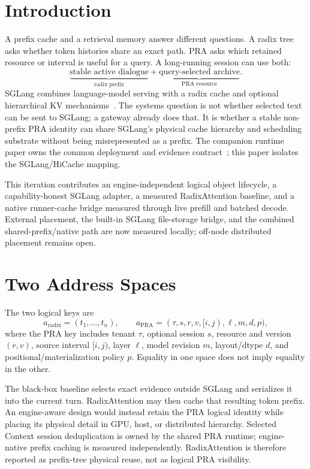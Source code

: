 \documentclass[10pt]{article}
\begin{document}
\section{Introduction}
A prefix cache and a retrieval memory answer different questions. A radix tree
asks whether token histories share an exact path. PRA asks which retained
resource or interval is useful for a query. A long-running session can use both:
\[
  \underbrace{\text{stable active dialogue}}_{\text{radix prefix}}
  +
  \underbrace{\text{query-selected archive}}_{\text{PRA resource}}.
\]
SGLang combines language-model serving with a radix cache and optional
hierarchical KV mechanisms~\cite{zheng2024sglang}. The systems question is not
whether selected text can be sent to SGLang; a gateway already does that. It is
whether a stable non-prefix PRA identity can share SGLang's physical cache
hierarchy and scheduling substrate without being misrepresented as a prefix.
The companion runtime paper owns the common deployment and evidence
contract~\cite{praruntime}; this paper isolates the SGLang/HiCache mapping.

This iteration contributes an engine-independent logical object lifecycle, a
capability-honest SGLang adapter, a measured RadixAttention baseline, and a
native runner-cache bridge measured through live prefill and batched decode.
External placement, the built-in SGLang file-storage bridge, and the combined
shared-prefix/native path are now measured locally; off-node distributed
placement remains open.

\section{Two Address Spaces}
The two logical keys are
\[
  a_{\mathrm{radix}} = (t_1,\ldots,t_n),
  \qquad
  a_{\mathrm{PRA}} =
  (\tau,s,r,v,[i,j),\ell,m,d,p),
\]
where the PRA key includes tenant $\tau$, optional session $s$, resource and
version $(r,v)$, source interval $[i,j)$, layer $\ell$, model revision $m$,
layout/dtype $d$, and positional/materialization policy $p$. Equality in one
space does not imply equality in the other.

The black-box baseline selects exact evidence outside SGLang and serializes it
into the current turn. RadixAttention may then cache that resulting token
prefix. An engine-aware design would instead retain the PRA logical identity
while placing its physical detail in GPU, host, or distributed hierarchy.
Selected Context session deduplication is owned by the shared PRA runtime;
engine-native prefix caching is measured independently. RadixAttention is
therefore reported as prefix-tree physical reuse, not as logical PRA visibility.
\end{document}
